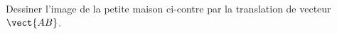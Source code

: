 
\begin{exercice}\label{exosmath-0053}

    \begin{multicols}{2}
        Dessiner l'image de la petite maison ci-contre par la translation de vecteur \( \vect{AB}\).

        \columnbreak
        \begin{center}
        
        \end{center}
    \end{multicols}

\end{exercice}

